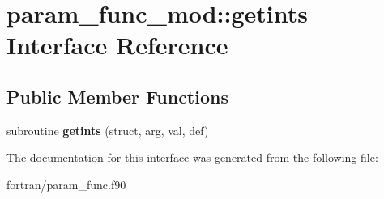 \hypertarget{interfaceparam__func__mod_1_1getints}{}\section{param\+\_\+func\+\_\+mod\+:\+:getints Interface Reference}
\label{interfaceparam__func__mod_1_1getints}
\subsection*{Public Member Functions}
\begin{DoxyCompactItemize}
\item 
\mbox{\label{interfaceparam__func__mod_1_1getints_a7f22ca8beaa648ba865b574dc31aac67}} 
subroutine {\bfseries getints} (struct, arg, val, def)
\end{DoxyCompactItemize}


The documentation for this interface was generated from the following file\+:\begin{DoxyCompactItemize}
\item 
fortran/param\+\_\+func.\+f90\end{DoxyCompactItemize}
